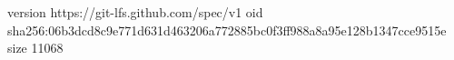 version https://git-lfs.github.com/spec/v1
oid sha256:06b3dcd8c9e771d631d463206a772885bc0f3ff988a8a95e128b1347cce9515e
size 11068
